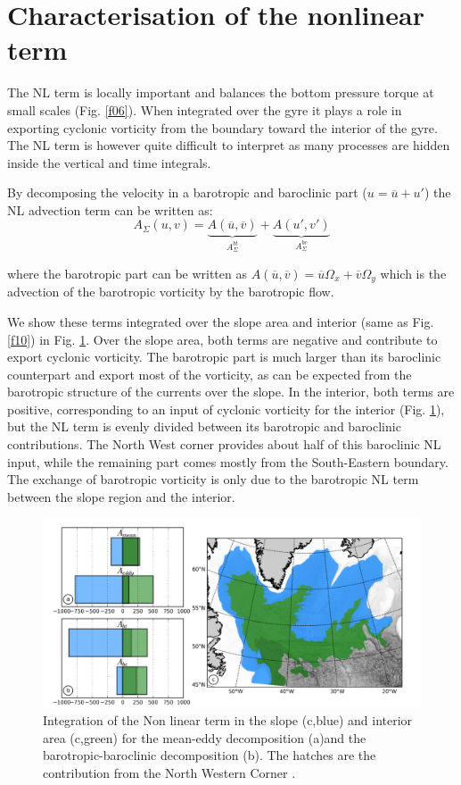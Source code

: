 \documentclass[os, manuscript]{copernicus}
\begin{document}
\section{Characterisation of the nonlinear term}

The NL term is locally important and balances the bottom pressure torque at small scales (Fig. \ref{f06}). When integrated over the gyre it plays a role in exporting cyclonic vorticity from the boundary toward the interior of the gyre. The NL term is however quite difficult to interpret as  many processes are hidden inside the vertical and time integrals. 

By decomposing the velocity in a barotropic and baroclinic part ($u = \overline{u} + u'$) the NL advection term can be written as:
\begin{equation}
A_{\Sigma}(u,v)=\underbrace{A(\overline{u},\overline{v})}_{A^{bt}_{\Sigma}}+\underbrace{A(u',v')}_{A^{bc}_{\Sigma}}
\end{equation}

where the barotropic part can be written as $A(\overline{u},\overline{v})= \overline{u}\Omega _x +\overline{v}\Omega _y$ which is the advection of the barotropic vorticity by the barotropic flow.  

We show these terms integrated over the slope area and interior (same as Fig. \ref{f10}) in Fig. \ref{f13}. Over the slope area, both terms are negative and contribute to export cyclonic vorticity. The barotropic part is much larger than its baroclinic counterpart and export most of the vorticity, as can be expected from the barotropic structure of the currents over the slope. In the interior, both terms are positive, corresponding to an input of cyclonic vorticity for the interior (Fig. \ref{f13}), but the NL term is evenly divided between its barotropic and baroclinic contributions. The North West corner provides about half of this baroclinic NL input, while the remaining part comes mostly from the South-Eastern boundary. The exchange of barotropic vorticity is only due to the barotropic NL term between the slope region and the interior.

\begin{figure}[t]
\includegraphics[width=14cm]{../fig_os/f13.pdf}
\caption{Integration of the Non linear term in the slope (c,blue) and interior area (c,green) for the mean-eddy decomposition (a)and the barotropic-baroclinic decomposition (b). The hatches are the contribution from the North Western Corner .}
\label{f13}
\end{figure} 
\end{document}
